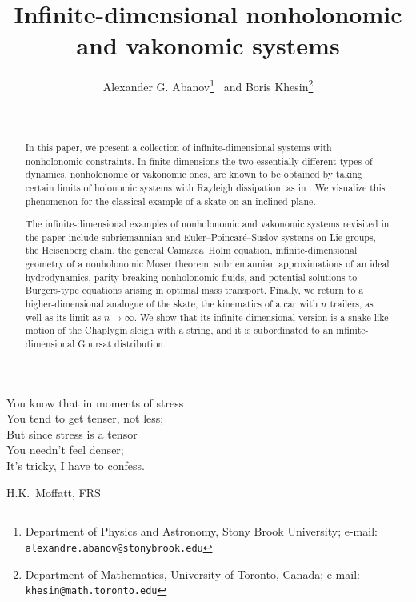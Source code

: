 \documentclass[11pt]{article}
\title {Infinite-dimensional  nonholonomic and vakonomic systems}
\date{~}
\author{Alexander G. Abanov\thanks{
    Department of Physics and Astronomy, Stony Brook University;
    e-mail:  \texttt{alexandre.abanov@stonybrook.edu}}~
and Boris Khesin\thanks{
    Department of Mathematics,
    University of Toronto, Canada;
    e-mail: \texttt{khesin@math.toronto.edu}}
}
\theoremstyle{definition}
\newcounter{ai}
\begin{document}
\maketitle

\vspace{-1cm}

\epigraph{You know that in moments of stress\\
You tend to get tenser, not less;\\
But since stress is a tensor\\
You needn't feel denser;\\
It's tricky, I have to confess.}{H.K.~Moffatt, FRS}


%
\begin{abstract}
In this paper, we present a collection of infinite-dimensional systems with nonholonomic constraints. 
In finite dimensions the two essentially different types of dynamics, nonholonomic or vakonomic ones, are known to be obtained by taking certain limits of holonomic systems with Rayleigh dissipation, as in \cite{kozlov1983realization}.
We visualize this phenomenon  for the classical example of a skate on an inclined plane.

The infinite-dimensional examples of nonholonomic and vakonomic systems revisited in the paper
include subriemannian and Euler–Poincaré–Suslov systems on  Lie groups, the Heisenberg chain, the general Camassa–Holm equation, infinite-dimensional geometry of a nonholonomic Moser theorem, subriemannian approximations of an ideal
hydrodynamics, parity-breaking nonholonomic fluids, and potential solutions to Burgers-type equations arising in optimal mass transport.
Finally, we return to a higher-dimensional analogue of the skate, the kinematics of a car with $n$ trailers, as well as its limit as
$n\to \infty$. We show that its infinite-dimensional version  is a snake-like motion of the 
Chaplygin sleigh with a string, and it is subordinated to  an infinite-dimensional Goursat distribution.



\end{abstract}


\tableofcontents

\end{document}
